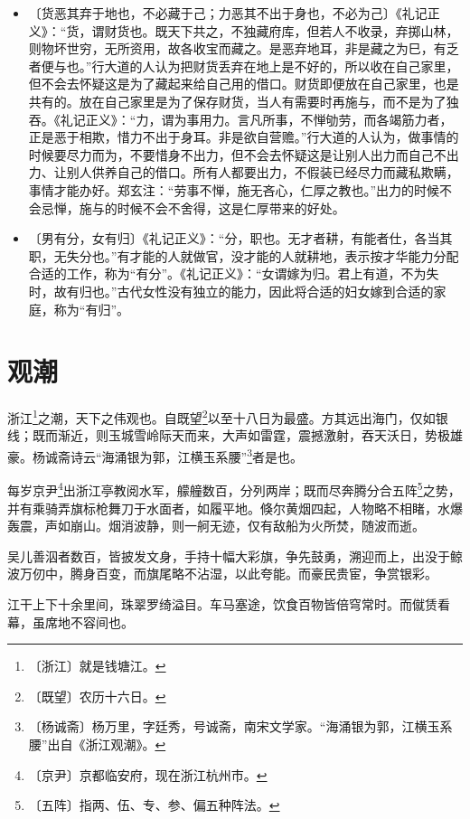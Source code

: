 \documentclass[12pt,UTF-8,openany,a4]{ctexbook}
\begin{document}
\begin{itemize}
    \setlength\itemsep{-0.2em}
    \item〔货恶其弃于地也，不必藏于己；力恶其不出于身也，不必为己〕{\yiwen 《礼记正义》：“货，谓财货也。既天下共之，不独藏府库，但若人不收录，弃掷山林，则物坏世穷，无所资用，故各收宝而藏之。是恶弃地耳，非是藏之为巳，有乏者便与也。”行大道的人认为把财货丢弃在地上是不好的，所以收在自己家里，但不会去怀疑这是为了藏起来给自己用的借口。财货即便放在自己家里，也是共有的。放在自己家里是为了保存财货，当人有需要时再施与，而不是为了独吞。《礼记正义》：“力，谓为事用力。言凡所事，不惮劬劳，而各竭筋力者，正是恶于相欺，惜力不出于身耳。非是欲自营赡。”行大道的人认为，做事情的时候要尽力而为，不要惜身不出力，但不会去怀疑这是让别人出力而自己不出力、让别人供养自己的借口。所有人都要出力，不假装已经尽力而藏私欺瞒，事情才能办好。郑玄注：“劳事不惮，施无吝心，仁厚之教也。”出力的时候不会忌惮，施与的时候不会不舍得，这是仁厚带来的好处。}
    \item〔男有分，女有归〕{\yiwen 《礼记正义》：“分，职也。无才者耕，有能者仕，各当其职，无失分也。”有才能的人就做官，没才能的人就耕地，表示按才华能力分配合适的工作，称为“有分”。《礼记正义》：“女谓嫁为归。君上有道，不为失时，故有归也。”古代女性没有独立的能力，因此将合适的妇女嫁到合适的家庭，称为“有归”。}
\end{itemize}

\chapter{观潮}

\begin{large}
    
    浙江\footnote{〔浙江〕\yiwen 就是钱塘江。}之潮，天下之伟观也。自既望\footnote{〔既望〕\yiwen 农历十六日。}以至十八日为最盛。方其远出海门，仅如银线；既而渐近，则玉城雪岭际天而来，大声如雷霆，震撼激射，吞天沃日，势极雄豪。杨诚斋诗云“海涌银为郭，江横玉系腰”\footnote{〔杨诚斋〕\yiwen 杨万里，字廷秀，号诚斋，南宋文学家。“海涌银为郭，江横玉系腰”出自《浙江观潮》。}者是也。
    
    每岁京尹\footnote{〔京尹〕\yiwen 京都临安府，现在浙江杭州市。}出浙江亭教阅水军，艨艟数百，分列两岸；既而尽奔腾分合五阵\footnote{〔五阵〕\yiwen 指两、伍、专、参、偏五种阵法。}之势，并有乘骑弄旗标枪舞刀于水面者，如履平地。倏尔黄烟四起，人物略不相睹，水爆轰震，声如崩山。烟消波静，则一舸无迹，仅有敌船为火所焚，随波而逝。
    
    吴儿善泅者数百，皆披发文身，手持十幅大彩旗，争先鼓勇，溯迎而上，出没于鲸波万仞中，腾身百变，而旗尾略不沾湿，以此夸能。而豪民贵宦，争赏银彩。
    
    江干上下十余里间，珠翠罗绮溢目。车马塞途，饮食百物皆倍穹常时。而僦赁看幕，虽席地不容间也。
\end{large}
\end{document}
